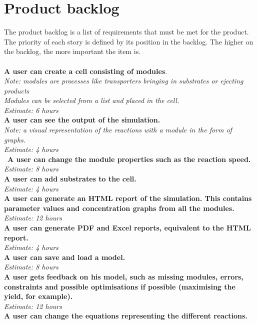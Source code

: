 \documentclass[10pt,a4paper]{report}
\begin{document}
	\section{Product backlog}
		The product backlog is a list of requirements that must be met for the product. The priority of each story is defined by its position in the backlog. The higher on the backlog, the more important the item is.\\
		\\
		\textbf{A user can create a cell consisting of modules}. \\
		\indent
			\textit{Note: modules are processes like transporters bringing in substrates or ejecting products\\
		\indent
			Modules can be selected from a list and placed in the cell.\\
		\indent
			Estimate: 6 hours} \\
		\textbf{A user can see the output of the simulation. }\\
		\indent
			\textit{Note: a visual representation of the reactions with a module in the form of graphs. \\
		\indent
			Estimate: 4 hours} \\\
		\textbf{A user can change the module properties such as the reaction speed.} \\
		\indent
			\emph{Estimate: 8 hours} \\
		\textbf{A user can add substrates to the cell.} \\
		\indent
			\emph{Estimate: 4 hours} \\
		\textbf{A user can generate an HTML report of the simulation. This contains parameter values and concentration graphs from all the modules.} \\
		\indent
			\emph{ Estimate: 12 hours} \\
		\textbf{A user can generate PDF and Excel reports, equivalent to the HTML report.} \\
		\indent
			\emph{Estimate: 4 hours} \\
		\textbf{A user can save and load a model.} \\
		\indent
			\emph{Estimate: 8 hours} \\
		\textbf{A user gets feedback on his model, such as missing modules, errors, constraints and possible optimisations if possible (maximising the yield, for example).} \\
		\indent
			\emph{Estimate: 12 hours} \\
		\textbf{A user can change the equations representing the different reactions.} \\
\end{document}
